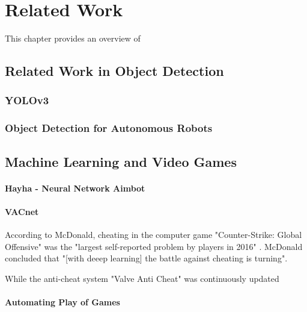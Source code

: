 \chapter{Related Work}
This chapter provides an overview of 

\section{Related Work in Object Detection}
\subsection{YOLOv3}
\cite{yolov3}

\subsection{Object Detection for Autonomous Robots}
\cite{Schweitzer2017}


\section{Machine Learning and Video Games}

\subsubsection{Hayha - Neural Network Aimbot}
\cite{Hayha}

\subsubsection{VACnet}
According to McDonald, cheating in the computer game "Counter-Strike: Global Offensive" was the "largest self-reported problem by players in 2016" \cite{VACnet}. McDonald concluded that "[with deeep learning] the battle against cheating is turning".

While the anti-cheat system "Valve Anti Cheat" was continuously updated

\subsubsection{Automating Play of Games}
\cite{Tom13thefirst}
\cite{Togelius09supermario} %
